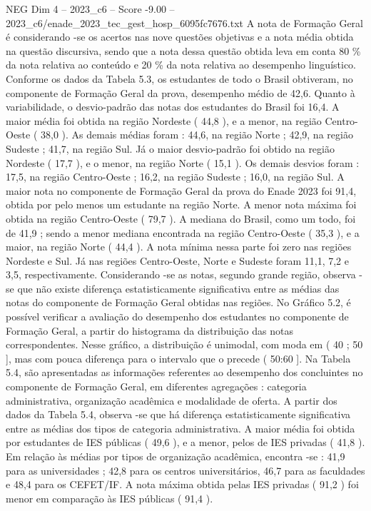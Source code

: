 \begin{textsample}{NEG Dim 4 – 2023\_c6 – Score -9.00 – 2023\_c6/enade\_2023\_tec\_gest\_hosp\_6095fc7676.txt}
A nota de Formação Geral é considerando -se os acertos nas nove questões objetivas e a nota média obtida na questão discursiva, sendo que a nota dessa questão obtida leva em conta 80 \% da nota relativa ao conteúdo e 20 \% da nota relativa ao desempenho linguístico.
Conforme os dados da Tabela 5.3, os estudantes de todo o Brasil obtiveram, no componente de Formação Geral da prova, desempenho médio de 42,6.
Quanto à variabilidade, o desvio-padrão das notas dos estudantes do Brasil foi 16,4.
A maior média foi obtida na região Nordeste ( 44,8 ), e a menor, na região Centro-Oeste ( 38,0 ).
As demais médias foram : 44,6, na região Norte ; 42,9, na região Sudeste ; 41,7, na região Sul.
Já o maior desvio-padrão foi obtido na região Nordeste ( 17,7 ), e o menor, na região Norte ( 15,1 ).
Os demais desvios foram : 17,5, na região Centro-Oeste ; 16,2, na região Sudeste ; 16,0, na região Sul.
A maior nota no componente de Formação Geral da prova do Enade 2023 foi 91,4, obtida por pelo menos um estudante na região Norte.
A menor nota máxima foi obtida na região Centro-Oeste ( 79,7 ).
A mediana do Brasil, como um todo, foi de 41,9 ; sendo a menor mediana encontrada na região Centro-Oeste ( 35,3 ), e a maior, na região Norte ( 44,4 ).
A nota mínima nessa parte foi zero nas regiões Nordeste e Sul.
Já nas regiões Centro-Oeste, Norte e Sudeste foram 11,1, 7,2 e 3,5, respectivamente.
Considerando -se as notas, segundo grande região, observa -se que não existe diferença estatisticamente significativa entre as médias das notas do componente de Formação Geral obtidas nas regiões.
No Gráfico 5.2, é possível verificar a avaliação do desempenho dos estudantes no componente de Formação Geral, a partir do histograma da distribuição das notas correspondentes.
Nesse gráfico, a distribuição é unimodal, com moda em ( 40 ; 50 ], mas com pouca diferença para o intervalo que o precede ( 50:60 ].
Na Tabela 5.4, são apresentadas as informações referentes ao desempenho dos concluintes no componente de Formação Geral, em diferentes agregações : categoria administrativa, organização acadêmica e modalidade de oferta.
A partir dos dados da Tabela 5.4, observa -se que há diferença estatisticamente significativa entre as médias dos tipos de categoria administrativa.
A maior média foi obtida por estudantes de IES públicas ( 49,6 ), e a menor, pelos de IES privadas ( 41,8 ).
Em relação às médias por tipos de organização acadêmica, encontra -se : 41,9 para as universidades ; 42,8 para os centros universitários, 46,7 para as faculdades e 48,4 para os CEFET/IF.
A nota máxima obtida pelas IES privadas ( 91,2 ) foi menor em comparação às IES públicas ( 91,4 ).

\end{textsample}
